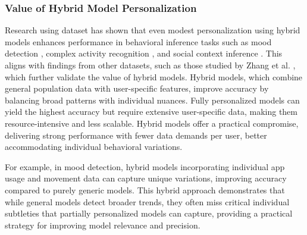 \subsubsection{Value of Hybrid Model Personalization}

 Research using \dataset dataset has shown that even modest personalization using hybrid models enhances performance in behavioral inference tasks such as mood detection \cite{meegahapola2023generalization}, complex activity recognition \cite{assi2023complex}, and social context inference \cite{mader2024learning}. This aligns with findings from other datasets, such as those studied by Zhang et al. \cite{zhang2024reproducible}, which further validate the value of hybrid models. Hybrid models, which combine general population data with user-specific features, improve accuracy by balancing broad patterns with individual nuances. Fully personalized models can yield the highest accuracy but require extensive user-specific data, making them resource-intensive and less scalable. %
Hybrid models offer a practical compromise, delivering strong performance with fewer data demands per user, better accommodating individual behavioral variations.

For example, in mood detection, hybrid models incorporating individual app usage and movement data can capture unique variations, improving accuracy compared to purely generic models. This hybrid approach demonstrates that while general models detect broader trends, they often miss critical individual subtleties that partially personalized models can capture, providing a practical strategy for improving model relevance and precision.



